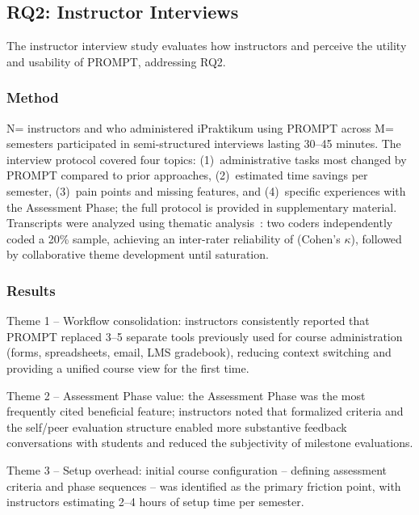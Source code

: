 \subsection{RQ2: Instructor Interviews}

The instructor interview study evaluates how instructors and  perceive the utility and usability of PROMPT, addressing RQ2.

\subsubsection{Method}

N=\missing{} instructors and  who administered iPraktikum using PROMPT across M=\missing{} semesters participated in semi-structured interviews lasting 30--45 minutes.
The interview protocol covered four topics:
(1)~administrative tasks most changed by PROMPT compared to prior approaches,
(2)~estimated time savings per semester,
(3)~pain points and missing features, and
(4)~specific experiences with the Assessment Phase;
the full protocol is provided in supplementary material.
Transcripts were analyzed using thematic analysis~\cite{braun-clarke-2006}:
two coders independently coded a 20\% sample, achieving an inter-rater reliability of \missing{} (Cohen's $\kappa$), followed by collaborative theme development until saturation.

\subsubsection{Results}

\begin{findingBox}
Theme 1 -- Workflow consolidation: instructors consistently reported that PROMPT replaced 3--5 separate tools previously used for course administration (forms, spreadsheets, email, LMS gradebook), reducing context switching and providing a unified course view for the first time.
\end{findingBox}

\begin{findingBox}
Theme 2 -- Assessment Phase value: the Assessment Phase was the most frequently cited beneficial feature;
instructors noted that formalized criteria and the self/peer evaluation structure enabled more substantive feedback conversations with students and reduced the subjectivity of milestone evaluations.
\end{findingBox}

\begin{findingBox}
Theme 3 -- Setup overhead: initial course configuration -- defining assessment criteria and phase sequences -- was identified as the primary friction point, with instructors estimating 2--4 hours of setup time per semester.
\end{findingBox}

